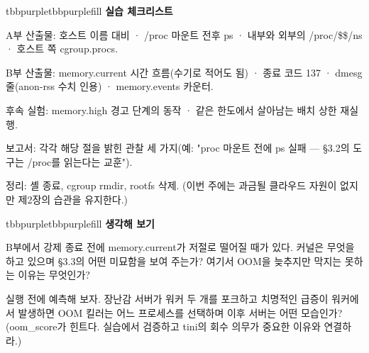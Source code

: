 \begin{calloutbox}{tbbpurple}{tbbpurplefill}
{\normalsize\bfseries\color{tbbpurple}실습 체크리스트}\par\vspace{3pt}
\begin{tbbitemize}
  \item A부 산출물: 호스트 이름 대비 · /proc 마운트 전후 ps · 내부와 외부의 /proc/\$\$/ns · 호스트 쪽 cgroup.procs.
  \item B부 산출물: memory.current 시간 흐름(수기로 적어도 됨) · 종료 코드 137 · dmesg 줄(anon-rss 수치 인용) · memory.events 카운터.
  \item 후속 실험: memory.high 경고 단계의 동작 · 같은 한도에서 살아남는 배치 상한 재실행.
  \item 보고서: 각각 해당 절을 밝힌 관찰 세 가지(예: "proc 마운트 전에 ps 실패 — §3.2의 도구는 /proc를 읽는다는 교훈").
  \item 정리: 셸 종료, cgroup rmdir, rootfs 삭제. (이번 주에는 과금될 클라우드 자원이 없지만 제2장의 습관을 유지한다.)
\end{tbbitemize}
\end{calloutbox}

\vspace{3.0pt}

\begin{calloutbox}{tbbpurple}{tbbpurplefill}
{\normalsize\bfseries\color{tbbpurple}생각해 보기}\par\vspace{3pt}
\begin{tbbitemize}
  \item B부에서 강제 종료 전에 memory.current가 저절로 떨어질 때가 있다. 커널은 무엇을 하고 있으며 §3.3의 어떤 미묘함을 보여 주는가? 여기서 OOM을 늦추지만 막지는 못하는 이유는 무엇인가?
  \item 실행 전에 예측해 보자. 장난감 서버가 워커 두 개를 포크하고 치명적인 급증이 워커에서 발생하면 OOM 킬러는 어느 프로세스를 선택하며 이후 서버는 어떤 모습인가? (oom\_score가 힌트다. 실습에서 검증하고 tini의 회수 의무가 중요한 이유와 연결하라.)
\end{tbbitemize}
\end{calloutbox}



